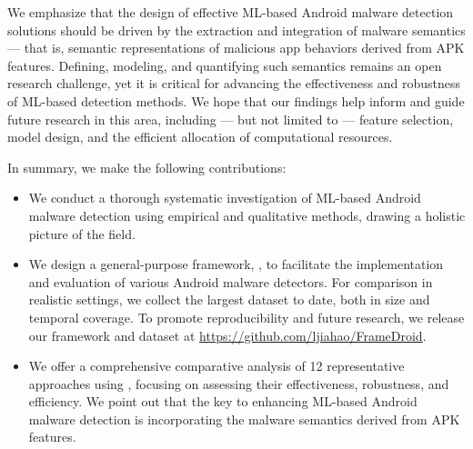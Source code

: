 We emphasize that the design of effective ML-based Android malware detection solutions should be driven by the extraction and integration of malware semantics --- that is, semantic representations of malicious app behaviors derived from APK features.
Defining, modeling, and quantifying such semantics remains an open research challenge, yet it is critical for advancing the effectiveness and robustness of ML-based detection methods.
We hope that our findings help inform and guide future research in this area, including --- but not limited to --- feature selection, model design, and the efficient allocation of computational resources.

In summary, we make the following contributions:
\begin{itemize}[leftmargin=10pt, topsep=0pt, itemsep=2pt]
  \item
  We conduct a thorough systematic investigation of ML-based Android malware detection using empirical and qualitative methods, drawing a holistic picture of the field.
  \item
  We design a general-purpose framework, \codename, to facilitate the implementation and evaluation of various Android malware detectors.
  For comparison in realistic settings, we collect the largest dataset to date, both in size and temporal coverage. To promote reproducibility and future research, we release our framework and dataset at \url{https://github.com/ljiahao/FrameDroid}.
  \item 
  We offer a comprehensive comparative analysis of 12 representative approaches using \codename, focusing on assessing their effectiveness, robustness, and efficiency. We point out that the key to enhancing ML-based Android malware detection is incorporating the malware semantics derived from APK features.
\end{itemize}

